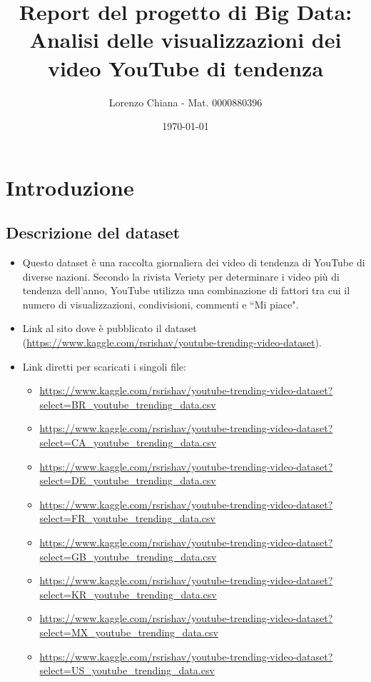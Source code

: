 \documentclass[10pt]{article}
\title{\textbf{Report del progetto di Big Data: \\Analisi delle visualizzazioni dei video YouTube di tendenza}}
\author{Lorenzo Chiana - Mat. 0000880396}
\date{\today}
\begin{document}
\maketitle
\newpage

\tableofcontents

\newpage

\section{Introduzione}
\subsection{Descrizione del dataset}

\begin{itemize}
\item Questo dataset è una raccolta giornaliera dei video di tendenza di YouTube di diverse nazioni. Secondo la rivista Veriety per determinare i video più di tendenza dell'anno, YouTube utilizza una combinazione di fattori tra cui il numero di visualizzazioni, condivisioni, commenti e ``Mi piace".
\item Link al sito dove è pubblicato il dataset (\url{https://www.kaggle.com/rsrishav/youtube-trending-video-dataset}).
\item Link diretti per scaricati i singoli file:
    \begin{itemize}
        \item \url{https://www.kaggle.com/rsrishav/youtube-trending-video-dataset?select=BR_youtube_trending_data.csv}
        \item \url{https://www.kaggle.com/rsrishav/youtube-trending-video-dataset?select=CA_youtube_trending_data.csv}
        \item \url{https://www.kaggle.com/rsrishav/youtube-trending-video-dataset?select=DE_youtube_trending_data.csv}
        \item \url{https://www.kaggle.com/rsrishav/youtube-trending-video-dataset?select=FR_youtube_trending_data.csv}
        \item \url{https://www.kaggle.com/rsrishav/youtube-trending-video-dataset?select=GB_youtube_trending_data.csv}
        \item \url{https://www.kaggle.com/rsrishav/youtube-trending-video-dataset?select=KR_youtube_trending_data.csv}
        \item \url{https://www.kaggle.com/rsrishav/youtube-trending-video-dataset?select=MX_youtube_trending_data.csv}
        \item \url{https://www.kaggle.com/rsrishav/youtube-trending-video-dataset?select=US_youtube_trending_data.csv}

\end{itemize}
\end{itemize}
\end{document}
